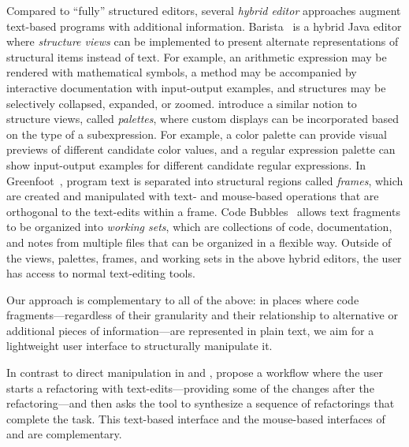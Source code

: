 Compared to ``fully'' structured editors, several \emph{hybrid editor}
approaches augment text-based programs with additional information.
Barista~\cite{Barista} is a hybrid Java editor where
\emph{structure views} can be implemented to present
alternate representations of structural items instead of text. For
example, an arithmetic expression may be rendered with mathematical
symbols, a method may be accompanied by
interactive documentation with input-output examples, and structures
may be selectively collapsed, expanded, or zoomed.
\citet{ActiveCodeCompletion} introduce a similar notion to
structure views, called \emph{palettes}, where custom displays can be
incorporated based on the type of a subexpression. For example, a
color palette can provide visual previews of different candidate color
values, and a regular expression palette can show input-output examples
for different candidate regular expressions.
In Greenfoot~\cite{Greenfoot}, program text is separated into
structural regions called \emph{frames}, which are created and
manipulated with text- and mouse-based operations that are orthogonal
to the text-edits within a frame.
Code Bubbles~\cite{CodeBubbles1} allows text fragments to
be organized into \emph{working sets}, which are collections of code,
documentation, and notes from multiple files that can be organized in
a flexible way.
Outside of the views, palettes, frames, and working sets in the
above hybrid editors, the user has access to normal text-editing tools.

Our approach is complementary to all of the above: in places where
code fragments---regardless of their granularity and their
relationship to alternative or additional pieces of information---are
represented in plain text, we aim for a lightweight user interface to
structurally manipulate it.


In contrast to direct manipulation in \dndr{} and \deuce{},
\citet{RefactoringWithSynthesis} propose a
workflow where the user starts a refactoring with
text-edits---providing some of the changes after the refactoring---and
then asks the tool to synthesize a
sequence of refactorings that complete the task.
This text-based interface and the mouse-based interfaces of \dndr{}
and \deuce{} are complementary.


